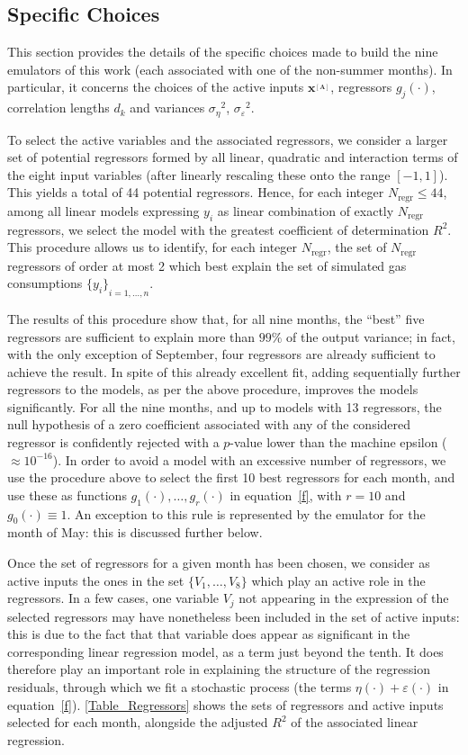 \documentclass[a4paper, 12pt]{article}
\newcommand{\bd}[1]{\boldsymbol{#1}}
\newcommand{\A}{{_{[A]}}}
\newcommand{\xA}{\bd{x^\A}}
\newcommand{\eps}{\varepsilon}
\newcommand{\Nr}{N_\text{regr}}
\begin{document}
\subsection{Specific Choices}\label{Sec_Choices}
This section provides the details of the specific choices made to build the nine emulators of this work (each associated with one of the non-summer months). In particular, it concerns the choices of the active inputs $\xA$, regressors $g_j(\cdot)$, correlation lengths $d_k$ and variances ${\sigma_\eta}^2$, ${\sigma_\eps}^2$. 


To select the active variables and the associated regressors, we consider a larger set of potential regressors formed by all linear, quadratic and interaction terms of the eight input variables (after linearly rescaling these onto the range $[-1,1]$). This yields a total of 44 potential regressors. Hence, for each integer $\Nr \leq 44$, among all linear models expressing $y_i$ as linear combination of exactly $\Nr$ regressors, we select the model with the greatest coefficient of determination $R^2$.
This procedure allows us to identify, for each integer $\Nr$, the set of $\Nr$ regressors of order at most 2 which best explain the set of simulated gas consumptions ${\{y_i\}}_{i=1, \dots, n}$.


The results of this procedure show that, for all nine months, the ``best'' five regressors are sufficient to explain more than $99\%$ of the output variance; in fact, with the only exception of September, four regressors are already sufficient to achieve the result. In spite of this already excellent fit, adding sequentially further regressors to the models, as per the above procedure, improves the models significantly. For all the nine months, and up to models with 13 regressors, the null hypothesis of a zero coefficient associated with any of the considered regressor is confidently rejected with a $p$-value lower than the machine epsilon ($\approx 10^{-16}$). 
In order to avoid a model with an excessive number of regressors, we use the procedure above to select the first 10 best regressors for each month, and use these as functions $g_1(\cdot), \dots, g_r(\cdot)$ in equation~\eqref{f}, with $r=10$ and $g_0(\cdot) \equiv 1$. An exception to this rule is represented by the emulator for the month of May: this is discussed further below.


Once the set of regressors for a given month has been chosen, we consider as active inputs the ones in the set $\{V_1, \dots, V_8\}$ which play an active role in the regressors. In a few cases, one variable $V_j$ not appearing in the expression of the selected regressors may have nonetheless been included in the set of active inputs: this is due to the fact that that variable does appear as significant in the corresponding linear regression model, as a term just beyond the tenth. It does therefore play an important role in explaining the structure of the regression residuals, through which we fit a stochastic process (the terms $ \eta(\cdot) + \eps(\cdot)$ in equation~\eqref{f}).
\autoref{Table_Regressors} shows the sets of regressors and active inputs selected for each month, alongside the adjusted $R^2$ of the associated linear regression.
\end{document}
